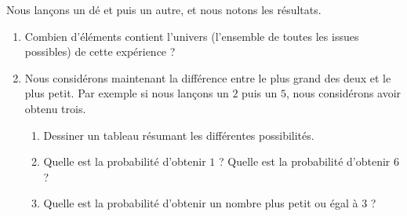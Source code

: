 
\begin{exercice}\label{exosmath-0357}

    Nous lançons un dé et puis un autre, et nous notons les résultats.
    \begin{enumerate}
        \item
            Combien d'éléments contient l'univers (l'ensemble de toutes les issues possibles) de cette expérience ? 
        \item
            Nous considérons maintenant la différence entre le plus grand des deux et le plus petit. Par exemple si nous lançons un \( 2\) puis un \( 5\), nous considérons avoir obtenu trois. 
            \begin{enumerate}
                \item 
            Dessiner un tableau résumant les différentes possibilités.
                \item
                   Quelle est la probabilité d'obtenir \( 1\) ? Quelle est la probabilité d'obtenir \( 6\) ?
                \item
                    Quelle est la probabilité d'obtenir un nombre plus petit ou égal à \( 3\) ?
            \end{enumerate}
    \end{enumerate}

\end{exercice}
